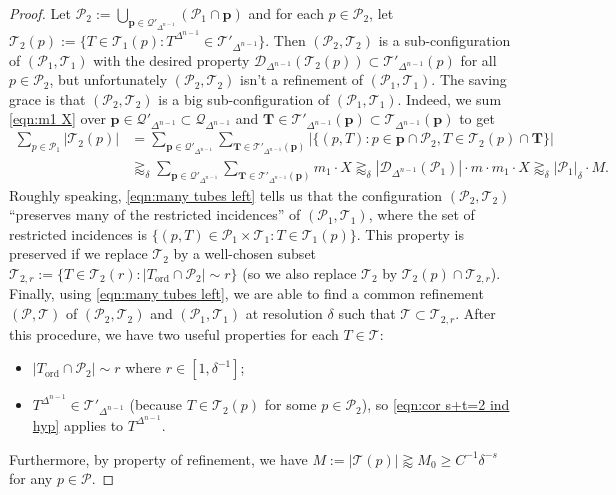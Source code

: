 \documentclass{amsart}
\newcommand{\T}{\mathcal{T}}
\newcommand{\geapp}{\gtrapprox}
\newcommand{\bp}{\mathbf{p}}
\newcommand{\bT}{\mathbf{T}}
\newcommand{\cD}{\mathcal{D}}
\newcommand{\cT}{\mathcal{T}}
\newcommand{\cQ}{\mathcal{Q}}
\newcommand{\cP}{\mathcal{P}}
\newcommand{\ord}{\mathrm{ord}}
\begin{document}
\begin{proof}
Let $\cP_2 := \bigcup_{\bp \in \cQ'_{\Delta^{n-1}}} (\cP_1 \cap \bp)$ and for each $p \in \cP_2$, let $\cT_2 (p) := \{ T \in \cT_1 (p) : T^{\Delta^{n-1}} \in \cT'_{\Delta^{n-1}} \}$. Then $(\cP_2, \cT_2)$ is a sub-configuration of $(\cP_1, \cT_1)$ with the desired property $\cD_{\Delta^{n-1}} (\T_2 (p)) \subset \T'_{\Delta^{n-1}} (p)$ for all $p \in \cP_2$, but unfortunately $(\cP_2, \cT_2)$ isn't a refinement of $(\cP_1, \cT_1)$. The saving grace is that $(\cP_2, \cT_2)$ is a big sub-configuration of $(\cP_1, \cT_1)$. Indeed, we sum \eqref{eqn:m1 X} over $\bp\in \cQ'_{\Delta^{n-1}} \subset \cQ_{\Delta^{n-1}}$ and $\bT\in \cT'_{\Delta^{n-1}} (\bp) \subset \cT_{\Delta^{n-1}} (\bp)$ to get
\begin{align}
    \sum_{p \in \cP_1} |\T_2 (p)| &=\sum_{\bp\in \cQ'_{\Delta^{n-1}}} \sum_{\bT\in \cT'_{\Delta^{n-1}} (\bp)} |\{(p, T): p\in \bp\cap \cP_2, T\in \cT_2(p)\cap \bT \}| \nonumber\\
    &\gtrapprox_\delta \sum_{\bp\in \cQ'_{\Delta^{n-1}}} \sum_{\bT\in \cT'_{\Delta^{n-1}} (\bp)} m_1 \cdot X \gtrapprox_\delta |\cD_{\Delta^{n-1}} (\cP_1)| \cdot m \cdot m_1 \cdot X \gtrapprox_{\delta} |\cP_1|_{\delta} \cdot M. \label{eqn:many tubes left}
\end{align}
Roughly speaking, \eqref{eqn:many tubes left} tells us that the configuration $(\cP_2, \cT_2)$ ``preserves many of the restricted incidences'' of $(\cP_1, \cT_1)$, where the set of restricted incidences is $\{ (p, T) \in \cP_1 \times \cT_1 : T \in \cT_1 (p) \}$. This property is preserved if we replace $\cT_2$ by a well-chosen subset $\cT_{2,r} := \{ T \in \cT_2 (r) : |T_\ord \cap \cP_2|\sim r \}$ (so we also replace $\cT_2$ by $\cT_2 (p) \cap \cT_{2,r}$). Finally, using \eqref{eqn:many tubes left}, we are able to find a common refinement $(\cP, \cT)$ of $(\cP_2, \cT_2)$ and $(\cP_1, \cT_1)$ at resolution $\delta$ such that $\cT \subset \cT_{2,r}$. After this procedure, we have two useful properties for each $T \in \cT$:
\begin{itemize}
    \item $|T_\ord \cap \cP_2|\sim r$ where $r \in [1, \delta^{-1}]$;

    \item $T^{\Delta^{n-1}} \in \T'_{\Delta^{n-1}}$ (because $T \in \T_2 (p)$ for some $p \in \cP_2$), so \eqref{eqn:cor s+t=2 ind hyp} applies to $T^{\Delta^{n-1}}$.
\end{itemize}
Furthermore, by property of refinement, we have $M := |\T(p)| \geapp M_0 \ge C^{-1} \delta^{-s}$ for any $p \in \cP$. 


\end{proof}
\end{document}
